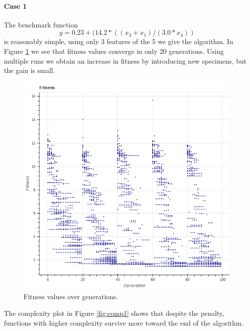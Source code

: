 \documentclass[10pt]{extarticle}
\begin{document}
\paragraph{Case 1}
The benchmark function \[
y=0.23+(14.2*((x_3+x_1)/(3.0*x_4))\]
 is reasonably simple, using only 3 features of the 5 we give the algorithm. 
In Figure \ref{fig:fit1} we see that fitness values converge in only 20 generations. Using multiple runs we obtain an increase in fitness by introducing new specimens, but the gain is small. 
\begin{figure}[H]
	\caption{Fitness values over generations.}
	\label{fig:fit1}
	\includegraphics[scale=0.3]{figures/fitness1.png}
\end{figure}
The complexity plot in Figure \ref{fig:comp1} shows that despite the penalty, functions with higher complexity survive more toward the end of the algorithm.
\end{document}
